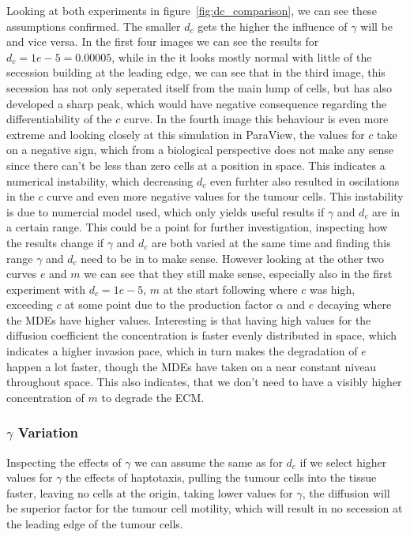 Looking at both experiments in figure~\ref{fig:dc_comparison}, we can see these assumptions confirmed. The smaller $d_c$ gets the higher the influence of $\gamma$ will be and vice versa. In the first four images we can see the results for $d_c=1e-5=0.00005$, while in the it looks mostly normal with little of the secession building at the leading edge, we can see that in the third image, this secession has not only seperated itself from the main lump of cells, but has also developed a sharp peak, which would have negative consequence regarding the differentiability of the $c$ curve. In the fourth image this behaviour is even more extreme and looking closely at this simulation in ParaView, the values for $c$ take on a negative sign, which from a biological perspective does not make any sense since there can't be less than zero cells at a position in space. This indicates a numerical instability, which decreasing $d_c$ even furhter also resulted in oscilations in the $c$ curve and even more negative values for the tumour cells. This instability is due to numercial model used, which only yields useful results if $\gamma$ and $d_c$ are in a certain range. This could be a point for further investigation, inspecting how the results change if $\gamma$ and $d_c$ are both varied at the same time and finding this range $\gamma$ and $d_c$ need to be in to make sense. However looking at the other two curves $e$ and $m$ we can see that they still make sense, especially also in the first experiment with $d_c=1e-5$, $m$ at the start following where $c$ was high, exceeding $c$ at some point due to the production factor $\alpha$ and $e$ decaying where the MDEs have higher values. Interesting is that having high values for the diffusion coefficient the concentration is faster evenly distributed in space, which indicates a higher invasion pace, which in turn makes the degradation of $e$ happen a lot faster, though the MDEs have taken on a near constant niveau throughout space. This also indicates, that we don't need to have a visibly higher concentration of $m$ to degrade the ECM. 

\subsubsection*{$\gamma$ Variation}
Inspecting the effects of $\gamma$ we can assume the same as for $d_c$ if we select higher values for $\gamma$ the effects of haptotaxis, pulling the tumour cells into the tissue faster, leaving no cells at the origin, taking lower values for $\gamma$, the diffusion will be superior factor for the tumour cell motility, which will result in no secession at the leading edge of the tumour cells.


